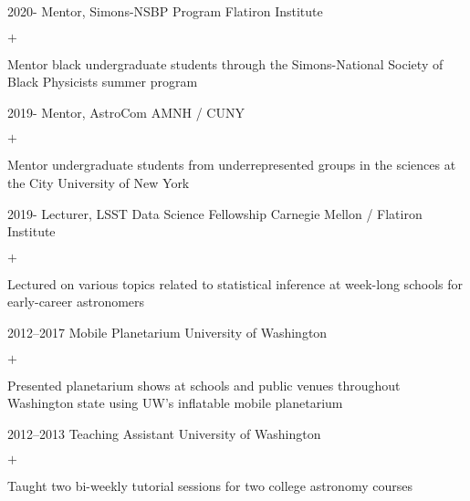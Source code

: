 \documentclass[]{luger-cv} %
\begin{document}
\begin{entrylist}


    \entry
    {2020-}
    {Mentor, Simons-NSBP Program}
    {Flatiron Institute}
    {%
        \vspace{-1em}
        \begin{list}{$+$}{\cvlist}
            \item Mentor black undergraduate students through the Simons-National
                  Society of Black Physicists summer program
        \end{list}
    }


    \entry
    {2019-}
    {Mentor, AstroCom}
    {AMNH / CUNY}
    {%
        \vspace{-1em}
        \begin{list}{$+$}{\cvlist}
            \item Mentor undergraduate students from underrepresented groups in the sciences
                  at the City University of New York
        \end{list}
    }


    \entry
    {2019-}
    {Lecturer, LSST Data Science Fellowship}
    {Carnegie Mellon / Flatiron Institute}
    {%
        \vspace{-1em}
        \begin{list}{$+$}{\cvlist}
            \item Lectured on various topics related to statistical
                  inference at week-long schools for early-career astronomers
        \end{list}
    }


    \entry
    {2012--2017}
    {Mobile Planetarium}
    {University of Washington}
    {%
        \vspace{-1em}
        \begin{list}{$+$}{\cvlist}
            \item Presented planetarium shows at schools and public venues throughout
                  Washington state using UW's inflatable mobile planetarium
        \end{list}
    }


    \entry
    {2012--2013}
    {Teaching Assistant}
    {University of Washington}
    {%
        \vspace{-1em}
        \begin{list}{$+$}{\cvlist}
            \item Taught two bi-weekly tutorial sessions for two college astronomy courses
        \end{list}
    }


    \ifdefined \onepage \else
\end{entrylist}
\end{document}
